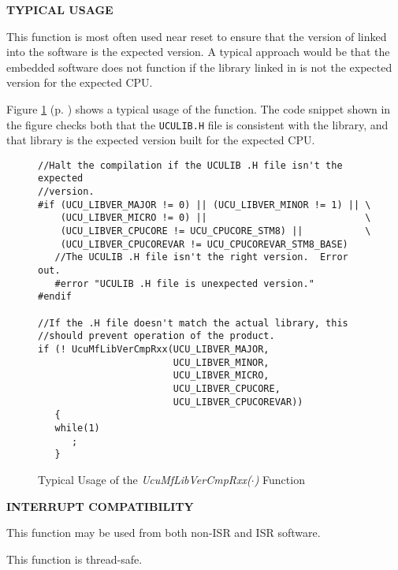 \noindent\textbf{TYPICAL USAGE}
\begin{list}{}{\setlength{\leftmargin}{0.25in}\setlength{\topsep}{0.0in}}
\item This function is most often used near reset to ensure that the
      version of \emph{\productname{}} linked into the software is
      the expected version.  A typical approach would be that the
      embedded software does not function if the library linked in is
      not the expected version for the expected CPU.
\item Figure \ref{fig:cmsc0:slcp0:00} (p. \pageref{fig:cmsc0:slcp0:00})
      shows a typical usage of the function.  The code snippet 
      shown in the figure checks both that the \texttt{UCULIB.H} file
      is consistent with the library, and that library is the expected
      version built for the expected CPU.
\end{list}
\vspace{2.8ex}

\begin{figure}
\begin{small}
\begin{verbatim}
//Halt the compilation if the UCULIB .H file isn't the expected
//version.
#if (UCU_LIBVER_MAJOR != 0) || (UCU_LIBVER_MINOR != 1) || \
    (UCU_LIBVER_MICRO != 0) ||                            \
    (UCU_LIBVER_CPUCORE != UCU_CPUCORE_STM8) ||           \
    (UCU_LIBVER_CPUCOREVAR != UCU_CPUCOREVAR_STM8_BASE)
   //The UCULIB .H file isn't the right version.  Error out.
   #error "UCULIB .H file is unexpected version."
#endif

//If the .H file doesn't match the actual library, this
//should prevent operation of the product.
if (! UcuMfLibVerCmpRxx(UCU_LIBVER_MAJOR, 
                        UCU_LIBVER_MINOR, 
                        UCU_LIBVER_MICRO, 
                        UCU_LIBVER_CPUCORE, 
                        UCU_LIBVER_CPUCOREVAR))
   {
   while(1)
      ;
   }
\end{verbatim}
\end{small}
\caption{Typical Usage of the \emph{UcuMfLibVerCmpRxx($\cdot$)} Function}
\label{fig:cmsc0:slcp0:00}
\end{figure}

\noindent\textbf{INTERRUPT COMPATIBILITY}
\begin{list}{}{\setlength{\leftmargin}{0.25in}\setlength{\topsep}{0.0in}}
\item This function may be used from both non-ISR and ISR software.
\item This function is thread-safe.
\end{list}
\vspace{2.8ex}

